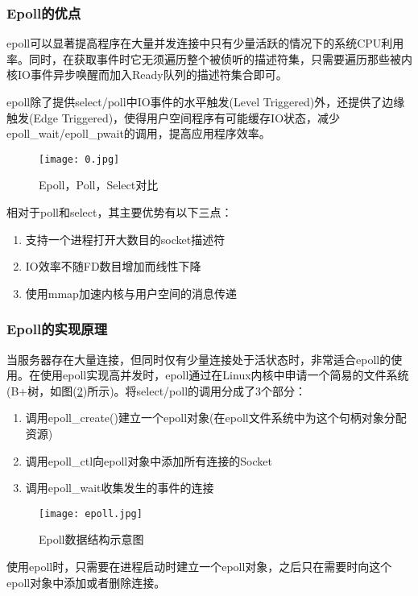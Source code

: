 \documentclass[bachelor]{thesis-uestc}
\begin{document}
\subsubsection{Epoll的优点}
epoll可以显著提高程序在大量并发连接中只有少量活跃的情况下的系统CPU利用率。同时，在获取事件时它无须遍历整个被侦听的描述符集，只需要遍历那些被内核IO事件异步唤醒而加入Ready队列的描述符集合即可。

epoll除了提供select/poll中IO事件的水平触发(Level Triggered)外，还提供了边缘触发(Edge Triggered)，使得用户空间程序有可能缓存IO状态，减少epoll\_wait/epoll\_pwait的调用，提高应用程序效率。

\begin{figure}[h]
\texttt{[image: 0.jpg]}
\caption{Epoll，Poll，Select对比}
\label{0} 
\end{figure}

相对于poll和select，其主要优势有以下三点：
\begin{enumerate}
	\item 支持一个进程打开大数目的socket描述符
	\item IO效率不随FD数目增加而线性下降
	\item 使用mmap加速内核与用户空间的消息传递
\end{enumerate}


\subsubsection{Epoll的实现原理}

当服务器存在大量连接，但同时仅有少量连接处于活状态时，非常适合epoll的使用。在使用epoll实现高并发时，epoll通过在Linux内核中申请一个简易的文件系统(B+树，如图(\ref{epoll})所示)。将select/poll的调用分成了3个部分：
\begin{enumerate}
	\item 调用epoll\_create()建立一个epoll对象(在epoll文件系统中为这个句柄对象分配资源)
	\item 调用epoll\_ctl向epoll对象中添加所有连接的Socket
	\item 调用epoll\_wait收集发生的事件的连接
\end{enumerate}

\begin{figure}[h]
\texttt{[image: epoll.jpg]}
\caption{Epoll数据结构示意图}
\label{epoll} 
\end{figure}

使用epoll时，只需要在进程启动时建立一个epoll对象，之后只在需要时向这个epoll对象中添加或者删除连接。
\end{document}
